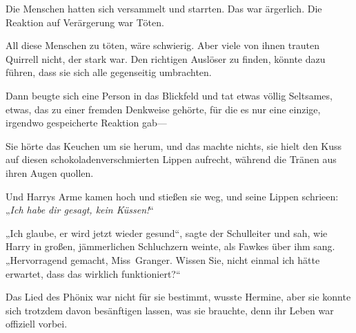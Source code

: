 Die Menschen hatten sich versammelt und starrten. Das war ärgerlich. Die Reaktion auf Verärgerung war Töten.

All diese Menschen zu töten, wäre schwierig. Aber viele von ihnen trauten Quirrell nicht, der stark war. Den richtigen Auslöser zu finden, könnte dazu führen, dass sie sich alle gegenseitig umbrachten.

Dann beugte sich eine Person in das Blickfeld und tat etwas völlig Seltsames, etwas, das zu einer fremden Denkweise gehörte, für die es nur eine einzige, irgendwo gespeicherte Reaktion gab—

\later

Sie hörte das Keuchen um sie herum, und das machte nichts, sie hielt den Kuss auf diesen schokoladenverschmierten Lippen aufrecht, während die Tränen aus ihren Augen quollen.

Und Harrys Arme kamen hoch und stießen sie weg, und seine Lippen schrieen: „\emph{Ich habe dir gesagt, kein Küssen!}“

\later

„Ich glaube, er wird jetzt wieder gesund“, sagte der Schulleiter und sah, wie Harry in großen, jämmerlichen Schluchzern weinte, als Fawkes über ihm sang. „Hervorragend gemacht, Miss~Granger. Wissen Sie, nicht einmal ich hätte erwartet, dass das wirklich funktioniert?“

Das Lied des Phönix war nicht für sie bestimmt, wusste Hermine, aber sie konnte sich trotzdem davon besänftigen lassen, was sie brauchte, denn ihr Leben war offiziell vorbei.


